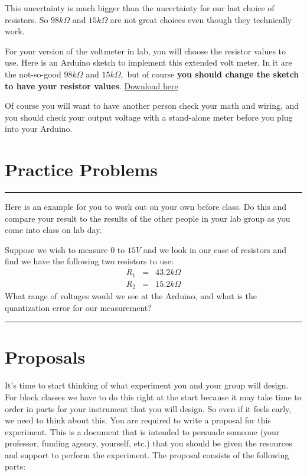 This uncertainty is much bigger than the uncertainty for our last choice of
resistors. So $98\unit{k%
\Omega%
}$ and $15\unit{k%
\Omega%
}$ are not great choices even though they technically work.

For your version of the voltmeter in lab, you will choose the resistor
values to use. Here is an Arduino sketch to implement this extended volt
meter. In it are the not-so-good $98\unit{k%
\Omega%
}$ and $15\unit{k%
\Omega%
},$ but of course \textbf{you should change the sketch to have your resistor
values}.
\href{https://dtoliphant.github.io/PH250Manual/Code/DAQ_Extended_voltmeter.ino}{Download here}



\bigskip Of course you will want to have another person check your math and
wiring, and you should check your output voltage with a stand-alone meter
before you plug into your Arduino.

\section{Practice Problems}

\rule{11cm}{0.03cm}

Here is an example for you to work out on your own before class. Do this and
compare your result to the results of the other people in your lab group as
you come into class on lab day.

Suppose we wish to measure $0$ to $15\unit{V}$ and we look in our case of
resistors and find we have the following two resistors to use:%
\begin{eqnarray*}
R_{1} &=&43.2\unit{k%
\Omega%
} \\
R_{2} &=&15.2\unit{k%
\Omega%
}
\end{eqnarray*}%
What range of voltages would we see at the Arduino, and what is the
quantization error for our measurement?

\rule{11cm}{0.03cm}

\section{Proposals}

It's time to start thinking of what experiment you and your group will design. For block classes we have to do this right at the start because it may take time to order in parts for your instrument that you will design. So even if it feels early, we need to think about this. 
You are required to write a proposal for this experiment. This is a document that is intended to persuade someone (your professor,  funding agency, yourself, etc.) that you should be given the resources and support to perform the experiment. The proposal consists of the following parts:

